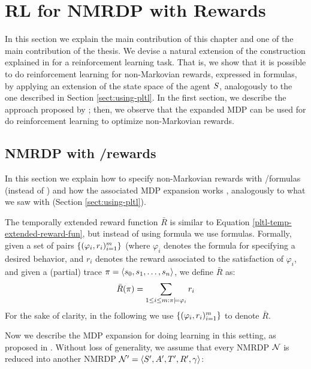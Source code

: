 \section{RL for NMRDP with \LLf Rewards}\label{sect:nmrdp-llf-rewards}
In this section we explain the main contribution of this chapter and one of the main contribution of the thesis. We devise a natural extension of the construction explained in \citep{AAAI1817342} for a reinforcement learning task. That is, we show that it is possible to do reinforcement learning for non-Markovian rewards, expressed in \LLf formulas, by applying an extension of the state space of the agent $S$, analogously to the one described in Section \ref{sect:using-pltl}.
In the first section, we describe the approach proposed by \citep{AAAI1817342}; then, we observe that the expanded MDP can be used for do reinforcement learning to optimize \LLf non-Markovian rewards.

\subsection{NMRDP with \LTLf/\LDLf rewards}\label{sect:nmrdp-llf-rewards-small}
In this section we explain how to specify non-Markovian rewards with \LTLf/\LDLf  formulas (instead of \PLTL) and how the associated MDP expansion works \citep{AAAI1817342}, analogously to what we saw with \PLTL (Section \ref{sect:using-pltl}).

The temporally extended reward function $\bar{R}$ is similar to Equation \ref{pltl-temp-extended-reward-fun}, but instead of using \PLTL formula we use \LLf formulas. Formally, given a set of pairs $\{(\varphi_i, r_i)^m_{i=1}\}$ (where $\varphi_i$ denotes the \LLf formula for specifying a desired behavior, and $r_i$ denotes the reward associated to the satisfaction of $\varphi_i$, and given a (partial) trace $\pi = \langle s_0, s_1, \dots, s_n \rangle$, we define $\bar{R}$ as:
\begin{equation}
\bar{R}(\pi) = \sum_{1\le i\le m: \pi \models \varphi_i} r_i
\end{equation}
For the sake of clarity, in the following we use $\{(\varphi_i, r_i)^m_{i=1}\}$ to denote $\bar{R}$.

Now we describe the MDP expansion for doing learning in this setting, as proposed in \citep{AAAI1817342}. 
Without loss of generality, we assume that every NMRDP $\mathcal{N}$ is reduced into another NMRDP $\mathcal{N}'=\langle S', A', T', R', \gamma \rangle$:


